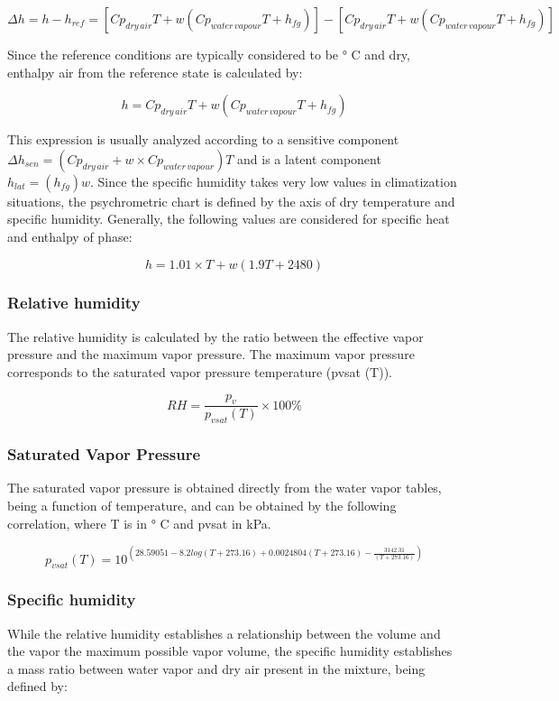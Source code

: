 \documentclass[]{book}
\theoremstyle{definition}
\theoremstyle{definition}
\theoremstyle{definition}
\theoremstyle{remark}
\begin{document}
\[\Delta h = h-h_{ref} = [Cp_{dry\, air}T+ w(Cp_{water\, vapour}T+h_{fg})]-[Cp_{dry\, air}T+ w(Cp_{water\, vapour}T+h_{fg})]\]

Since the reference conditions are typically considered to be ° C and
dry, enthalpy air from the reference state is calculated by:

\[h = Cp_{dry\, air}T+ w(Cp_{water\, vapour}T+h_{fg})\]

This expression is usually analyzed according to a sensitive component
\(\Delta h_{sen} = (Cp_{dry\, air}+ w \times Cp_{water\, vapour})T\) and
is a latent component \(h_{lat} =(h_{fg})w\). Since the specific
humidity takes very low values in climatization situations, the
psychrometric chart is defined by the axis of dry temperature and
specific humidity. Generally, the following values are considered for
specific heat and enthalpy of phase:

\[h = 1.01\times T + w(1.9T + 2480)\]

\subsubsection{Relative humidity}\label{relative-humidity}

The relative humidity is calculated by the ratio between the effective
vapor pressure and the maximum vapor pressure. The maximum vapor
pressure corresponds to the saturated vapor pressure temperature (pvsat
(T)).

\[RH = \frac{p_v}{p_{vsat}(T)}\times 100 \%\]

\subsubsection{Saturated Vapor Pressure}\label{saturated-vapor-pressure}

The saturated vapor pressure is obtained directly from the water vapor
tables, being a function of temperature, and can be obtained by the
following correlation, where T is in ° C and pvsat in kPa.

\[p_{vsat}(T)= 10^{(28.59051-8.2log(T+273.16)+0.0024804(T+273.16) - \frac{3142.31}{(T+273.16)})}\]

\subsubsection{Specific humidity}\label{specific-humidity}

While the relative humidity establishes a relationship between the
volume and the vapor the maximum possible vapor volume, the specific
humidity establishes a mass ratio between water vapor and dry air
present in the mixture, being defined by:
\end{document}
